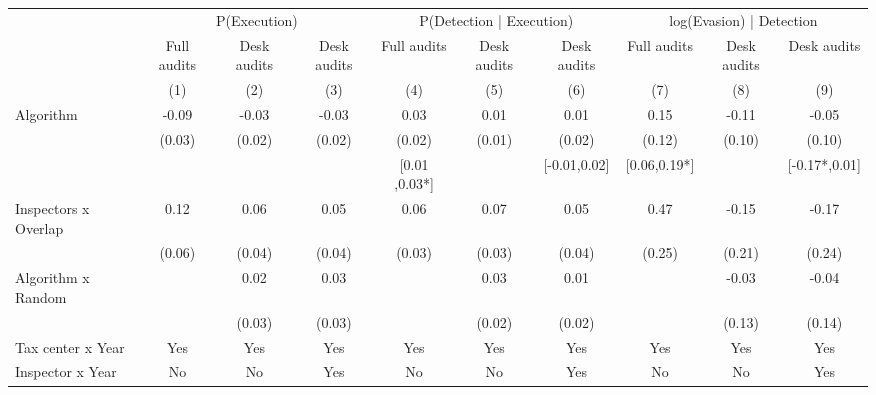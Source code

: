 \begin{tabular}{lccc|ccc|ccc} \toprule
\multicolumn{1}{l}{} & \multicolumn{3}{c}{P(Execution)} & \multicolumn{3}{c}{P(Detection | Execution)} & \multicolumn{3}{c}{log(Evasion) | Detection} \\\cmidrule(lr){2-4}\cmidrule(lr){5-7}\cmidrule(lr){8-10} \multicolumn{1}{l}{} & Full audits & Desk audits & Desk audits & Full audits & Desk audits & Desk audits & Full audits & Desk audits & Desk audits \\ \multicolumn{1}{l}{} & (1) & (2) & (3) & (4) & (5) & (6) & (7) & (8) & (9) \\ \midrule
Algorithm   &       -0.09\sym{***}&       -0.03\sym{*}  &       -0.03\sym{**} &        0.03\sym{**} &        0.01         &        0.01         &        0.15         &       -0.11         &       -0.05         \\
            &      (0.03)         &      (0.02)         &      (0.02)         &      (0.02)         &      (0.01)         &      (0.02)         &      (0.12)         &      (0.10)         &      (0.10)         \\
\addlinespace
 & & & & [0.01 ,0.03*] & & [-0.01,0.02] & [0.06,0.19*] & & [-0.17*,0.01] \\  Inspectors x Overlap&        0.12\sym{*}  &        0.06         &        0.05         &        0.06\sym{*}  &        0.07\sym{**} &        0.05         &        0.47\sym{*}  &       -0.15         &       -0.17         \\
            &      (0.06)         &      (0.04)         &      (0.04)         &      (0.03)         &      (0.03)         &      (0.04)         &      (0.25)         &      (0.21)         &      (0.24)         \\
\addlinespace
Algorithm x Random&                     &        0.02         &        0.03         &                     &        0.03         &        0.01         &                     &       -0.03         &       -0.04         \\
            &                     &      (0.03)         &      (0.03)         &                     &      (0.02)         &      (0.02)         &                     &      (0.13)         &      (0.14)         \\
\midrule
Tax center x Year&         Yes         &         Yes         &         Yes         &         Yes         &         Yes         &         Yes         &         Yes         &         Yes         &         Yes         \\
Inspector x Year&          No         &          No         &         Yes         &          No         &          No         &         Yes         &          No         &          No         &         Yes         \\

\end{tabular}
